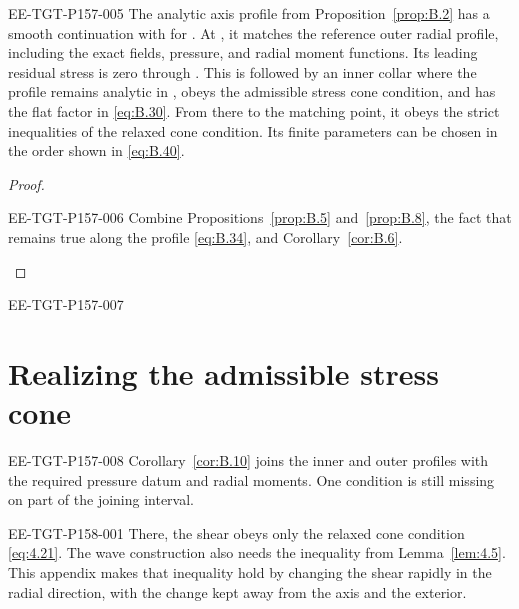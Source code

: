 \begin{corollary}\label{cor:B.10}
\begin{EESegment}{EE-TGT-P157-005}
The analytic axis profile from Proposition~\ref{prop:B.2} has a smooth continuation with
 for . At
, it matches the reference outer radial profile, including the exact fields,
pressure, and radial moment functions. Its leading residual stress is zero through
. This is followed
by an inner collar where the profile remains analytic in , obeys the admissible stress cone
condition, and has the flat factor in \eqref{eq:B.30}. From there to the matching point, it obeys the strict inequalities of the relaxed cone condition. Its finite parameters can be chosen in the order shown in \eqref{eq:B.40}.
\end{EESegment}
\end{corollary}

\begin{proof}
\begin{EESegment}{EE-TGT-P157-006}
Combine Propositions~\ref{prop:B.5} and~\ref{prop:B.8}, the fact that
 remains true along the profile \eqref{eq:B.34},
and Corollary~\ref{cor:B.6}.
\end{EESegment}
\end{proof}

\begin{EESegment}{EE-TGT-P157-007}
\section{Realizing the admissible stress cone}\label{sec:C}
\end{EESegment}

\begin{EESegment}{EE-TGT-P157-008}
Corollary~\ref{cor:B.10} joins the inner and outer profiles  with the required pressure datum
and radial moments. One condition is still missing on part of the joining interval.
\end{EESegment}
%
\begin{EESegment}{EE-TGT-P158-001}
There, the shear
 obeys only the relaxed cone condition \eqref{eq:4.21}. The wave construction also needs the
inequality  from Lemma~\ref{lem:4.5}. This appendix makes that inequality hold by changing the shear rapidly in the radial direction, with the change kept away from the axis and the exterior.
\end{EESegment}

